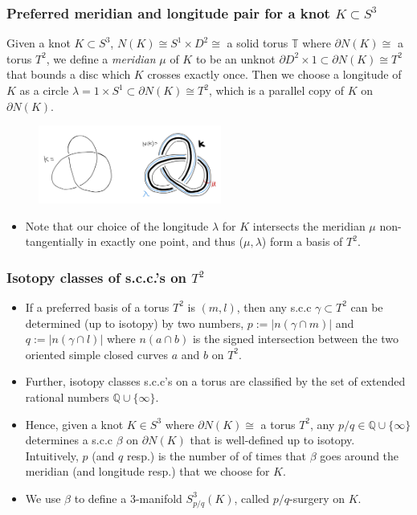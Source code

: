 \documentclass{beamer}
\theoremstyle{ex}
\theoremstyle{rem}
\begin{document}
	\begin{frame}
		\frametitle{Preferred meridian and longitude pair for a knot $K \subset S^3$}
		\begin{definition} 
		Given a knot $K \subset S^3$, $N(K) \cong S^1 \times D^2 \cong$ a solid torus $\mathbb{T}$ where $\partial N(K) \cong$ a torus $T^2$, we define a \textit{meridian} $\mu$ of $K$ to be an unknot $\partial D^2 \times {1} \subset \partial N(K) \cong T^2$ that bounds a disc which $K$ crosses exactly once. Then we choose a longitude of $K$ as a circle $\lambda = {1} \times S^1 \subset \partial N(K) \cong T^2$, which is a parallel copy of $K$ on $\partial N(K)$.
		\end{definition}
		\begin{figure}
			\centering
			\includegraphics[width=60mm]{N(K).jpg}
		\end{figure}
		\begin{itemize}
		\item Note that our choice of the longitude $\lambda$ for $K$ intersects the meridian $\mu$ non-tangentially in exactly one point, and thus ($\mu, \lambda$) form a basis of $T^2$.
		\end{itemize}
	\end{frame}	

	\begin{frame}
		\frametitle{Isotopy classes of s.c.c.'s on $T^2$}
		\begin{itemize}
		\item If a preferred basis of a torus $T^2$ is $(m, l)$, then any s.c.c $\gamma \subset T^2$ can be determined (up to isotopy) by two numbers, $p:=|n(\gamma \cap m)|$ and $q:=|n(\gamma \cap l)|$ where $n(a \cap b)$ is the signed intersection between the two oriented simple closed curves $a$ and $b$ on $T^2$. 
		\end{itemize}
		\begin{itemize}
		\item Further, isotopy classes s.c.c's on a torus are classified by the set of extended rational numbers $\mathbb{Q}\cup\{\infty\}$. 
		\end{itemize}		
		\begin{itemize}
		\item Hence, given a knot $K \in S^3$ where $\partial N(K) \cong$ a torus $T^2$, any $p/q \in \mathbb{Q}\cup\{\infty\}$ determines a s.c.c $\beta$ on $\partial N(K)$ that is well-defined up to isotopy. Intuitively, $p$ (and $q$ resp.) is the number of of times that $\beta$ goes around the meridian (and longitude resp.) that we choose for $K$. 
		\item We use $\beta$ to define a $3$-manifold $S^3_{p/q}(K)$, called $p/q$-surgery on $K$.
		\end{itemize}
	\end{frame}
\end{document}
